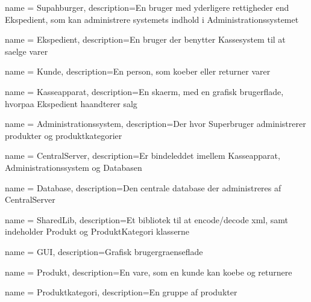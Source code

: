 {	name = Supahburger,
	description={En bruger med yderligere rettigheder end Ekspedient, som kan administrere systemets indhold i Administrationssystemet}
}

{	name = Ekspedient,
	description={En bruger der benytter Kassesystem til at saelge varer}
}

{	name = Kunde,
	description={En person, som koeber eller returner varer}
}

{	name = Kasseapparat,
	description={En skaerm, med en grafisk brugerflade, hvorpaa Ekspedient haandterer salg}
}

{	name = Administrationssystem,
	description={Der hvor Superbruger administrerer produkter og produktkategorier}
}
	
{	name = CentralServer,
	description={Er bindeleddet imellem Kasseapparat, Administrationssystem og Databasen}
}

{	name = Database,
	description={Den centrale database der administreres af CentralServer}
}

{	name = SharedLib,
	description={Et bibliotek til at encode/decode xml, samt indeholder Produkt og ProduktKategori klasserne}
}

{	name = GUI,
	description={Grafisk brugergraenseflade}
}

{	name = Produkt,
	description={En vare, som en kunde kan koebe og returnere}
}

{	name = Produktkategori,
	description={En gruppe af produkter}
}	





